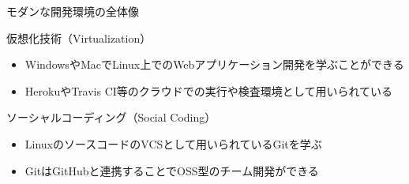 \documentclass[t, aspectratio=169]{beamer}
\begin{document}
\begin{frame}[label=sec-1-4-4]{モダンな開発環境の全体像}
\begin{block}{仮想化技術（Virtualization）}
\begin{itemize}
\item WindowsやMacでLinux上でのWebアプリケーション開発を学ぶことができる
\item HerokuやTravis CI等のクラウドでの実行や検査環境として用いられている
\end{itemize}
\end{block}
\begin{block}{ソーシャルコーディング（Social Coding）}
\begin{itemize}
\item LinuxのソースコードのVCSとして用いられているGitを学ぶ
\item GitはGitHubと連携することでOSS型のチーム開発ができる
\end{itemize}
\end{block}
\end{frame}
\end{document}
